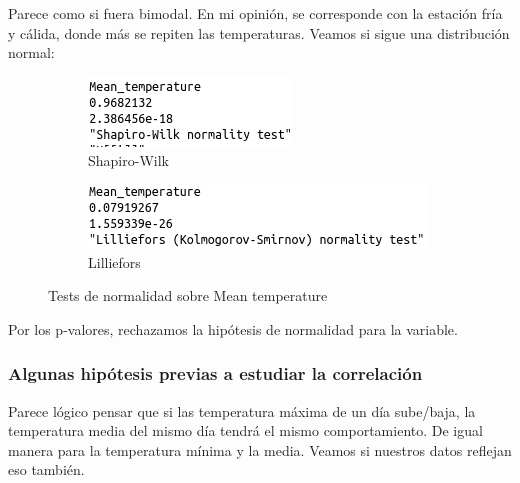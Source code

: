 Parece como si fuera bimodal. En mi opinión, se corresponde con la estación fría y cálida, donde más se repiten las temperaturas. Veamos si sigue una distribución normal:


\begin{figure}[H]
	\centering
	\begin{subfigure}{.5\textwidth}
		\centering
		\includegraphics[width=.7\linewidth]{shapiro-mt.png}
		\caption{Shapiro-Wilk}
		\label{fig:sw-mt}
	\end{subfigure}%
	\begin{subfigure}{.5\textwidth}
		\centering
		\includegraphics[width=.7\linewidth]{lillie-mt.png}	
		\caption{Lilliefors}
		\label{fig:l-mt}
	\end{subfigure}
	\caption{Tests de normalidad sobre Mean temperature}
	\label{fig:norm-mt}
\end{figure}

Por los p-valores, rechazamos la hipótesis de normalidad para la variable. 

\subsubsection{Algunas hipótesis previas a estudiar la correlación}

Parece lógico pensar que si las temperatura máxima de un día sube/baja, la temperatura media del mismo día tendrá el mismo comportamiento. De igual manera para la temperatura mínima y la media. Veamos si nuestros datos reflejan eso también.

